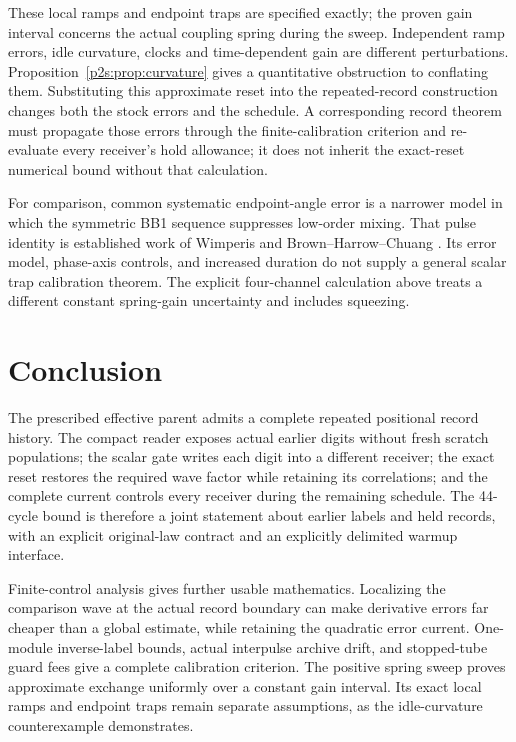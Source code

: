 \documentclass[11pt]{article}
\numberwithin{equation}{section}
\theoremstyle{definition}
\theoremstyle{remark}
\begin{document}
These local ramps and endpoint traps are specified exactly; the proven
gain interval concerns the actual coupling spring during the sweep.
Independent ramp errors, idle curvature, clocks and time-dependent gain
are different perturbations. Proposition~\ref{p2s:prop:curvature} gives a
quantitative obstruction to conflating them. Substituting this approximate
reset into the repeated-record construction changes both the stock errors
and the schedule. A corresponding record theorem must propagate those
errors through the finite-calibration criterion and re-evaluate every
receiver's hold allowance; it does not inherit the exact-reset numerical
bound without that calculation.

For comparison, common systematic endpoint-angle error is a narrower
model in which the symmetric BB1 sequence suppresses low-order mixing.
That pulse identity is established work of Wimperis and Brown--Harrow--Chuang
\cite{Wimperis1994,BrownHarrowChuang2004}. Its error model, phase-axis controls,
and increased duration do not supply a general scalar trap calibration
theorem. The explicit four-channel calculation above treats a different
constant spring-gain uncertainty and includes squeezing.

\section{Conclusion}\label{p2s:sec:conclusion}

The prescribed effective parent admits a complete repeated positional
record history. The compact reader exposes actual earlier digits without
fresh scratch populations; the scalar gate writes each digit into a
different receiver; the exact reset restores the required wave factor
while retaining its correlations; and the complete current controls
every receiver during the remaining schedule. The 44-cycle bound is
therefore a joint statement about earlier labels and held records,
with an explicit original-law contract and an explicitly delimited
warmup interface.

Finite-control analysis gives further usable mathematics. Localizing
the comparison wave at the actual record boundary can make derivative
errors far cheaper than a global estimate, while retaining the quadratic
error current. One-module inverse-label bounds, actual interpulse
archive drift, and stopped-tube guard fees give a complete calibration
criterion. The positive spring sweep proves approximate exchange
uniformly over a constant gain interval. Its exact local ramps and
endpoint traps remain separate assumptions, as the idle-curvature
counterexample demonstrates.
\end{document}
